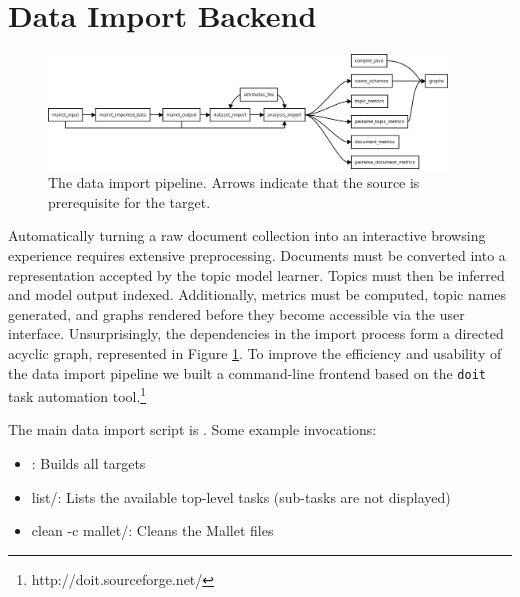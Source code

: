\documentclass[11pt]{article}
\begin{document}
\section{Data Import Backend}
\begin{figure}[t]
 \centering
 \includegraphics[width=400px,keepaspectratio=true]{./build_flowchart.png}
 \caption{The data import pipeline. Arrows indicate that the source is prerequisite for the target.}
 \label{fig:build_flowchart}
\end{figure}

Automatically turning a raw document collection into an interactive browsing
experience requires extensive preprocessing. Documents must be converted into a
representation accepted by the topic model learner. Topics must then be inferred
and model output indexed. Additionally, metrics must be computed, topic names
generated, and graphs rendered before they become accessible via the user
interface. Unsurprisingly, the dependencies in the import process form a directed acyclic graph, represented in Figure \ref{fig:build_flowchart}. To
improve the efficiency and usability of the data import pipeline we built a
command-line frontend based on the \texttt{doit} task automation tool.\footnote{http://doit.sourceforge.net/}

The main data import script is \texttt{\buildscript{}}. Some example invocations:
\begin{itemize}
 \item \texttt{\buildscript{}}: Builds all targets
 \item \texttt{\buildscript{}} list/: Lists the available top-level tasks (sub-tasks are not displayed)
 \item \texttt{\buildscript{}} clean -c mallet/: Cleans the Mallet files
\end{itemize}

\end{document}
